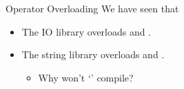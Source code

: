 \begin{frame}{Operator Overloading}
    We have seen that
    \begin{itemize}
        \item The IO library overloads  and .
        \item The string library overloads  and .
        \begin{itemize}
            \item Why won't `' compile?
        \end{itemize}
    \end{itemize}
\end{frame}